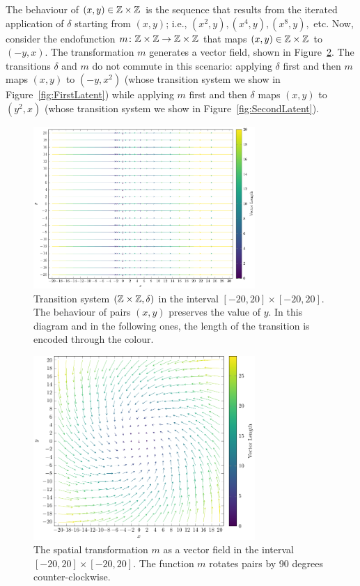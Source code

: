 The behaviour of $(x,y)\in \mathbb{Z}\times\mathbb{Z}$ is the sequence that results from the iterated application of $\delta$ starting from $(x,y)$; i.e., $(x^2,y),(x^4,y),(x^8,y),$ etc. Now, consider the endofunction $m\colon \mathbb{Z}\times\mathbb{Z}\rightarrow \mathbb{Z}\times\mathbb{Z}$ that maps $(x,y)\in \mathbb{Z}\times\mathbb{Z}$ to $(-y,x)$. The transformation $m$ generates a vector field, shown in Figure~\ref{fig:SpatialDeformation}. The transitions $\delta$ and $m$ do not commute in this scenario: applying $\delta$ first and then $m$ maps $(x,y)$ %
to $(-y,x^2)$ (whose transition system we show in Figure~\ref{fig:FirstLatent}) while applying $m$ first and then $\delta$ maps $(x,y)$ to $(y^2,x)$ (whose transition system we show in Figure~\ref{fig:SecondLatent}). %
\begin{figure}[!t]
  \centering
  \includegraphics[width=0.75\textwidth]{Figures/VectorSpace1.pdf} 
  \caption{Transition system $(\mathbb{Z}\times\mathbb{Z}, \delta)$ in the interval $[-20,20]\times[-20,20]$. The behaviour of pairs $(x,y)$ preserves the value of $y$. In this diagram and in the following ones, the length of the transition is encoded through the colour.} 
  \label{fig:IntroVectorSpace}
\end{figure} 
\begin{figure}[!t]
  \centering
  \includegraphics[width=0.75\textwidth]{Figures/VectorSpace2.pdf} 
  \caption{The spatial transformation $m$ as a vector field in the interval $[-20,20]\times[-20,20]$. The function $m$ rotates pairs by 90 degrees counter-clockwise.} 
  \label{fig:SpatialDeformation} 
\end{figure} 

